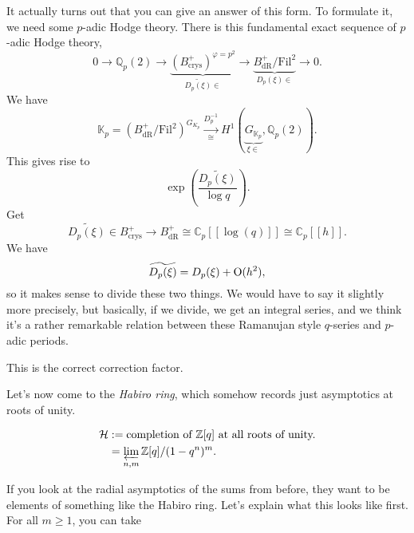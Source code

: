 \documentclass[reqno]{amsart} 
\begin{document}
It actually turns out that you can give an answer of this form.  To formulate it, we need some $p$-adic Hodge theory.  There is this fundamental exact sequence of $p$-adic Hodge theory,
\begin{equation*}
  0 \rightarrow \mathbb{Q}_p(2)
  \rightarrow
  \underbrace
  {
    (B_{\mathrm{crys}}^+)^{\varphi = p^2}  
  }_{
    \widetilde{D_p(\xi)} \in 
  }
  \rightarrow
  \underbrace
  {
    B_{\mathrm{d R}}^+ / \mathrm{Fil}^2
  }_{
    D_p(\xi) \in 
  }
  \rightarrow 0.
\end{equation*}
We have
\begin{equation*}
  \mathbb{K}_p = \left( B_{\mathrm{d R}}^+ / \mathrm{Fil}^2 \right)^{G_{K_p}}
  \xrightarrow[\cong]{D_p^{-1}}
  H^1 \left( \underbrace
    {
      G_{\mathbb{K}_p}
    }_{
      \xi \in
    },   \mathbb{Q}_p(2) \right).
\end{equation*}
This gives rise to
\begin{equation*}
  \exp \left( \frac{\widetilde{D_p(\xi)}}{\log q} \right).
\end{equation*}
Get
\begin{equation*}
  \widetilde{D_p(\xi)} \in B_{\mathrm{crys}}^+ \rightarrow B_{\mathrm{d R}}^+
  \cong \mathbb{C}_p[[\log(q)]]
  \cong \mathbb{C}_p[[h]].
\end{equation*}
We have
\begin{equation*}
  \widetilde{D_p(\xi)} = D_p(\xi) + \operatorname{O}(h^2),
\end{equation*}
so it makes sense to divide these two things.  We would have to say it slightly more precisely, but basically, if we divide, we get an integral series, and we think it's a rather remarkable relation between these Ramanujan style $q$-series and $p$-adic periods.
\begin{theorem}[GSWZ]
  This is the correct correction factor.
\end{theorem}
Let's now come to the \emph{Habiro ring}, which somehow records just asymptotics at roots of unity.
\begin{definition}[Habiro, 2005]
  \begin{align*}
    \mathcal{H} &:= \text{completion of } \mathbb{Z}[q] \text{ at all roots of unity.} \\
                &= \varprojlim_{n, m} \mathbb{Z}[q] /(1 - q^n)^m.
  \end{align*}
\end{definition}
If you look at the radial asymptotics of the sums from before, they want to be elements of something like the Habiro ring.  Let's explain what this looks like first.  For all $m \geq 1$, you can take
\end{document}
